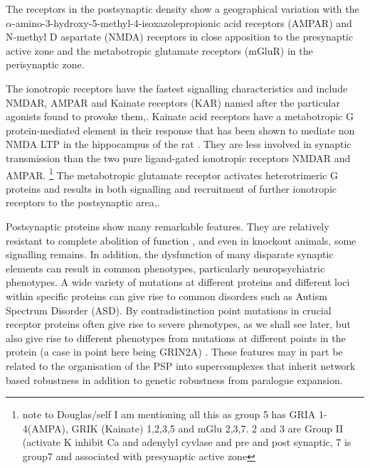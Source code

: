  The receptors in the postsynaptic density show a geographical variation with the $\alpha$-amino-3-hydroxy-5-methyl-4-isoxazolepropionic acid  receptors (AMPAR) and N-methyl D aspartate (NMDA) receptors in close apposition to the presynaptic active zone and the metabotropic glutamate receptors (mGluR) in the perisynaptic zone\cite{scheefhals2018functional}.
 
 The ionotropic receptors have the fastest signalling characteristics and include NMDAR, AMPAR  and Kainate receptors (KAR) named after the particular agonists found to provoke them\cite{nakanishi1992molecular},\cite{bettler1995ampa}. Kainate acid receptors have a metabotropic G protein-mediated element in their response that has been shown to mediate non NMDA LTP in the hippocampus of the rat \cite{petrovic2017metabotropic}. They are less involved in synaptic transmission \cite{contractor2011kainate} than the two pure ligand-gated ionotropic receptors NMDAR and AMPAR.
 \footnote{note to Douglas/self I am mentioning all this as group 5 has GRIA 1-4(AMPA), GRIK (Kainate) 1,2,3,5 and mGlu 2,3,7. 2 and 3 are Group II (activate K inhibit Ca and adenylyl cyvlase and pre and post synaptic, 7 is group7 and associated with presynaptic active zone}  
 The metabotropic glutamate receptor activates heterotrimeric G proteins and results in both signalling and recruitment of further ionotropic receptors to the postsynaptic area\cite{niswender2010metabotropic},\cite{pin2016organization}.  
 
Postsynaptic proteins show many remarkable features. They are relatively resistant to complete abolition of function \cite{keverne1997evaluation}, \cite{charlesworth2016canalization} and even in knockout animals, some signalling remains. In addition, the dysfunction of many disparate synaptic elements can result in common phenotypes, particularly neuropsychiatric phenotypes. A wide variety of mutations at different proteins and different loci within specific proteins can give rise to common disorders such as Autism Spectrum Disorder (ASD)\cite{toro2010key}. By contradistinction point mutations in crucial receptor proteins often give rise to severe phenotypes, as we shall see later, but also give rise to different phenotypes from mutations at different points in the protein (a case in point here being GRIN2A) \cite{endele2010mutations}. These features may in part be related to the organisation of the PSP into supercomplexes that inherit network based robustness in addition to genetic robustness from paralogue expansion\cite{grant2016molecular}.



